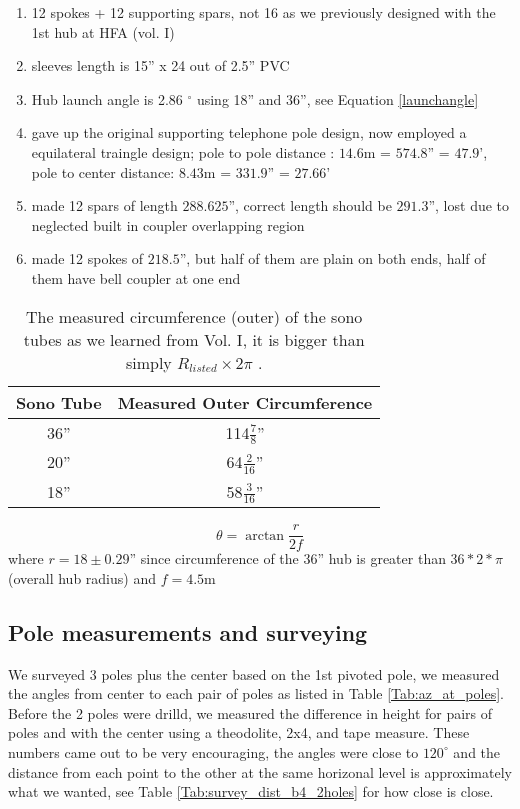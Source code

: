 \documentclass[12pt, letter]{article}
\begin{document}
\begin{enumerate}
    \item{12 spokes + 12 supporting spars, not 16 as we previously designed with the 1st hub at HFA (vol. I)}
    \item{sleeves length is 15'' x 24 out of 2.5'' PVC}
    \item{Hub launch angle is 2.86 $^{\circ}$ using 18'' and 36'', see Equation \ref{launchangle}}
    \item{gave up the original supporting telephone pole design, now employed a
    equilateral traingle design; pole to pole distance : $14.6$m = $574.8$'' = $47.9$',
    pole to center distance: $8.43$m = $331.9$'' =  $27.66$'}
    \item{made 12 spars of length $288.625$'', correct length should be $291.3$'',
    lost due to neglected built in coupler overlapping region}
    \item{made 12 spokes of $218.5$'', but half of them are plain on both
      ends, half of them have bell coupler at one end}
\end{enumerate}

\begin{table}[!h]
  \centering
  \begin{tabular}{|c|c|} \hline
    
    Sono Tube & Measured Outer Circumference \\ \hline
    36'' & 114$\frac{7}{8}$''  \\ \hline
    20'' & 64$\frac{2}{16}$'' \\ \hline
    18'' & 58$\frac{3}{16}$'' \\ \hline
  \end{tabular}
  \caption{The measured circumference (outer) of the sono tubes as we learned from Vol. I, it is bigger than simply $R_{listed} \times 2\pi$ \label{Tab:circum_sono}.}
\end{table}

\begin{equation}
\theta = \arctan{\frac{r}{2f}} 
\label{launchangle}
\end{equation}
where $r = 18 \pm 0.29$'' since circumference of the $36$'' hub is greater than $36 * 2 *\pi$(overall hub radius) and $f = 4.5$m


\subsection{Pole measurements and surveying}
We surveyed $3$ poles plus the center based on the 1st pivoted pole, we measured the angles from center to each pair of poles as listed in Table \ref{Tab:az_at_poles}. Before the 2 poles were drilld, we measured the difference in height for pairs of poles and with the center using a theodolite, 2x4, and tape measure. These numbers came out to be very encouraging, the angles were close to $120^\circ$ and the distance from each point to the other at the same horizonal level is approximately what we wanted, see Table \ref{Tab:survey_dist_b4_2holes} for how close is close.\\
\end{document}
